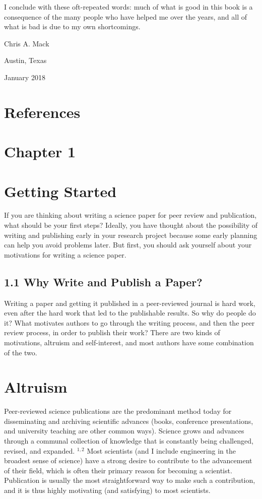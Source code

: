 I conclude with these oft-repeated words: much of what is good in this book is a consequence of the many people who have helped me over the years, and all of what is bad is due to my own shortcomings.

Chris A. Mack

Austin, Texas

January 2018

\section*{References}
\section*{Chapter 1}
\section*{Getting Started}
If you are thinking about writing a science paper for peer review and publication, what should be your first steps? Ideally, you have thought about the possibility of writing and publishing early in your research project because some early planning can help you avoid problems later. But first, you should ask yourself about your motivations for writing a science paper.

\subsection*{1.1 Why Write and Publish a Paper?}
Writing a paper and getting it published in a peer-reviewed journal is hard work, even after the hard work that led to the publishable results. So why do people do it? What motivates authors to go through the writing process, and then the peer review process, in order to publish their work? There are two kinds of motivations, altruism and self-interest, and most authors have some combination of the two.

\section*{Altruism}
Peer-reviewed science publications are the predominant method today for disseminating and archiving scientific advances (books, conference presentations, and university teaching are other common ways). Science grows and advances through a communal collection of knowledge that is constantly being challenged, revised, and expanded. ${ }^{1,2}$ Most scientists (and I include engineering in the broadest sense of science) have a strong desire to contribute to the advancement of their field, which is often their primary reason for becoming a scientist. Publication is usually the most straightforward way to make such a contribution, and it is thus highly motivating (and satisfying) to most scientists.

